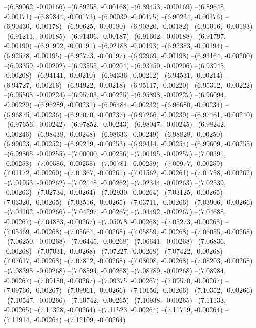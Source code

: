 --(6.89062, -0.00166)
--(6.89258, -0.00168)
--(6.89453, -0.00169)
--(6.89648, -0.00171)
--(6.89844, -0.00173)
--(6.90039, -0.00175)
--(6.90234, -0.00176)
--(6.90430, -0.00178)
--(6.90625, -0.00180)
--(6.90820, -0.00182)
--(6.91016, -0.00183)
--(6.91211, -0.00185)
--(6.91406, -0.00187)
--(6.91602, -0.00188)
--(6.91797, -0.00190)
--(6.91992, -0.00191)
--(6.92188, -0.00193)
--(6.92383, -0.00194)
--(6.92578, -0.00195)
--(6.92773, -0.00197)
--(6.92969, -0.00198)
--(6.93164, -0.00200)
--(6.93359, -0.00202)
--(6.93555, -0.00204)
--(6.93750, -0.00206)
--(6.93945, -0.00208)
--(6.94141, -0.00210)
--(6.94336, -0.00212)
--(6.94531, -0.00214)
--(6.94727, -0.00216)
--(6.94922, -0.00218)
--(6.95117, -0.00220)
--(6.95312, -0.00222)
--(6.95508, -0.00224)
--(6.95703, -0.00225)
--(6.95898, -0.00227)
--(6.96094, -0.00229)
--(6.96289, -0.00231)
--(6.96484, -0.00232)
--(6.96680, -0.00234)
--(6.96875, -0.00236)
--(6.97070, -0.00237)
--(6.97266, -0.00239)
--(6.97461, -0.00240)
--(6.97656, -0.00242)
--(6.97852, -0.00243)
--(6.98047, -0.00245)
--(6.98242, -0.00246)
--(6.98438, -0.00248)
--(6.98633, -0.00249)
--(6.98828, -0.00250)
--(6.99023, -0.00252)
--(6.99219, -0.00253)
--(6.99414, -0.00254)
--(6.99609, -0.00255)
--(6.99805, -0.00255)
--(7.00000, -0.00256)
--(7.00195, -0.00257)
--(7.00391, -0.00258)
--(7.00586, -0.00258)
--(7.00781, -0.00259)
--(7.00977, -0.00259)
--(7.01172, -0.00260)
--(7.01367, -0.00261)
--(7.01562, -0.00261)
--(7.01758, -0.00262)
--(7.01953, -0.00262)
--(7.02148, -0.00262)
--(7.02344, -0.00263)
--(7.02539, -0.00263)
--(7.02734, -0.00264)
--(7.02930, -0.00264)
--(7.03125, -0.00265)
--(7.03320, -0.00265)
--(7.03516, -0.00265)
--(7.03711, -0.00266)
--(7.03906, -0.00266)
--(7.04102, -0.00266)
--(7.04297, -0.00267)
--(7.04492, -0.00267)
--(7.04688, -0.00267)
--(7.04883, -0.00267)
--(7.05078, -0.00268)
--(7.05273, -0.00268)
--(7.05469, -0.00268)
--(7.05664, -0.00268)
--(7.05859, -0.00268)
--(7.06055, -0.00268)
--(7.06250, -0.00268)
--(7.06445, -0.00268)
--(7.06641, -0.00268)
--(7.06836, -0.00268)
--(7.07031, -0.00268)
--(7.07227, -0.00268)
--(7.07422, -0.00268)
--(7.07617, -0.00268)
--(7.07812, -0.00268)
--(7.08008, -0.00268)
--(7.08203, -0.00268)
--(7.08398, -0.00268)
--(7.08594, -0.00268)
--(7.08789, -0.00268)
--(7.08984, -0.00267)
--(7.09180, -0.00267)
--(7.09375, -0.00267)
--(7.09570, -0.00267)
--(7.09766, -0.00267)
--(7.09961, -0.00266)
--(7.10156, -0.00266)
--(7.10352, -0.00266)
--(7.10547, -0.00266)
--(7.10742, -0.00265)
--(7.10938, -0.00265)
--(7.11133, -0.00265)
--(7.11328, -0.00264)
--(7.11523, -0.00264)
--(7.11719, -0.00264)
--(7.11914, -0.00264)
--(7.12109, -0.00264)

